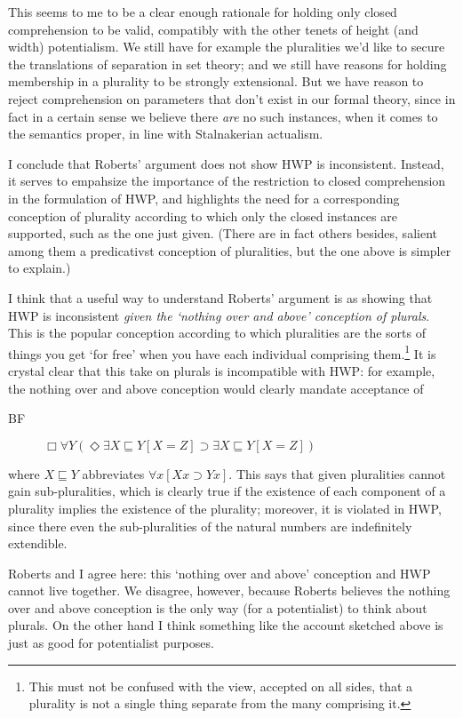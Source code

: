 \documentclass{article}
\begin{document}
This seems to me to be a clear enough rationale for holding only closed comprehension 
to be valid, compatibly with the other tenets of height (and width) potentialism.
We still have for example the pluralities we'd like to secure the translations 
of separation in set theory; and we still have reasons for holding membership in 
a plurality to be strongly extensional. But we have reason to reject 
comprehension on parameters that don't exist in our formal theory, since 
in fact in a certain sense 
we believe there \emph{are} no such instances, when it comes to the semantics proper,
in line with Stalnakerian actualism.

I conclude that Roberts' argument does not show HWP is inconsistent.
Instead, it serves to empahsize the importance of the 
restriction to closed comprehension
in the formulation of HWP, 
and highlights the need for a corresponding conception of 
plurality according to which 
only the closed instances are supported, such as the one just given. 
(There are in fact others besides, salient among them a predicativst 
conception of pluralities, but the one above is simpler to explain.)

I think that a useful way to understand Roberts' argument is as showing
that HWP is inconsistent \emph{given the 
`nothing over and above' conception of plurals}. This is the popular conception 
according to which pluralities are the sorts of things you get `for free'
when you have each individual comprising them.\footnote{This must not be confused with 
the view, accepted on all sides, that a plurality is not a single thing 
separate from the many comprising it.} It is crystal 
clear that this take on plurals is incompatible with HWP: for example, 
the nothing over and above conception would clearly mandate acceptance of 
\begin{description}
    \item[BF] $\Box \forall Y (\Diamond \exists X \sqsubseteq Y [X = Z] \supset \exists X \sqsubseteq Y[X = Z])$
\end{description}
where $X \sqsubseteq Y$ abbreviates $\forall x[Xx \supset Yx]$. 
This says that given pluralities cannot gain sub-pluralities, which 
is clearly true if the existence of each component of a plurality 
implies the existence of the plurality; moreover, it is violated 
in HWP, since there even the sub-pluralities of the natural numbers are indefinitely 
extendible.

Roberts and I agree here:
this `nothing over and above' conception and HWP cannot live together.
We disagree, however, because Roberts believes the nothing over and above 
conception is the only way (for a potentialist) to think about plurals.
On the other hand I think something like the account sketched above is 
just as good for potentialist purposes. 
 
\end{document}
